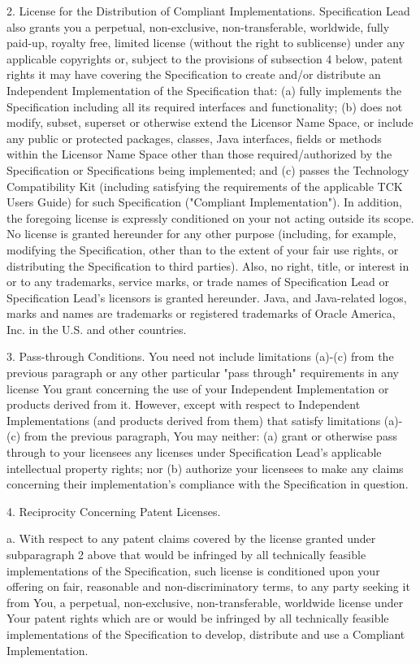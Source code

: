 \begin{flushleft}
2. License for the Distribution of Compliant Implementations. Specification Lead 
also grants you a perpetual, non-exclusive, non-transferable, worldwide, fully paid-up, 
royalty free, limited license (without the right to sublicense) under any applicable 
copyrights or, subject to the provisions of subsection 4 below, patent rights it may 
have covering the Specification to create and/or distribute an Independent Implementation 
of the Specification that: 
(a) fully implements the Specification including all its required interfaces and functionality; 
(b) does not modify, subset, superset or otherwise extend the Licensor Name Space, 
or include any public or protected packages, classes, Java interfaces, fields or methods 
within the Licensor Name Space other than those required/authorized by the Specification 
or Specifications being implemented; and 
(c) passes the Technology Compatibility Kit (including satisfying the requirements of 
the applicable TCK Users Guide) for such Specification ("Compliant Implementation"). 
In addition, the foregoing license is expressly conditioned on your not acting outside 
its scope. No license is granted hereunder for any other purpose (including, for 
example, modifying the Specification, other than to the extent of your fair use rights, 
or distributing the Specification to third parties).  Also, no right, title, or interest 
in or to any trademarks, service marks, or trade names of Specification Lead or 
Specification Lead's licensors is granted hereunder. Java, and Java-related logos, 
marks and names are trademarks or registered trademarks of Oracle America, Inc. in the U.S. and other countries.

3. Pass-through Conditions. You need not include limitations (a)-(c) from the previous 
paragraph or any other particular "pass through" requirements in any license You 
grant concerning the use of your Independent Implementation or products derived from it. 
However, except with respect to Independent Implementations (and products derived from 
them) that satisfy limitations (a)-(c) from the previous paragraph, You may neither: 
(a) grant or otherwise pass through to your licensees any licenses under Specification Lead’s 
applicable intellectual property rights; nor (b) authorize your licensees to make 
any claims concerning their implementation's compliance with the Specification in question.

4. Reciprocity Concerning Patent Licenses.  

 \hspace{1em} a. With respect to any patent claims covered by the license granted 
under subparagraph 2 above that would be infringed by all technically feasible implementations 
of the Specification, such license is conditioned upon your offering on fair, reasonable 
and non-discriminatory terms, to any party seeking it from You, a perpetual, non-exclusive, 
non-transferable, worldwide license under Your patent rights which are or would be 
infringed by all technically feasible implementations of the Specification to develop, 
distribute and use a Compliant Implementation.


\end{flushleft}

